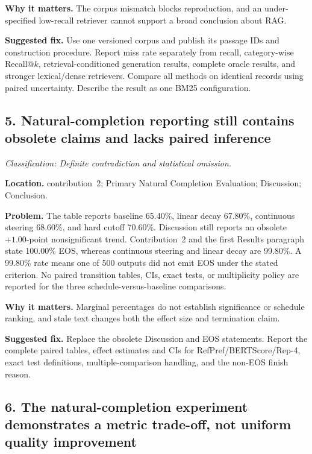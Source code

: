 \documentclass[11pt]{article}
\newcommand{\findinglabel}[1]{\textbf{#1}}
\newcommand{\classification}[1]{\textit{Classification: #1.}}
\begin{document}
\findinglabel{Why it matters.} The corpus mismatch blocks reproduction, and an under-specified low-recall retriever cannot support a broad conclusion about RAG.

\findinglabel{Suggested fix.} Use one versioned corpus and publish its passage IDs and construction procedure.  Report miss rate separately from recall, category-wise Recall@$k$, retrieval-conditioned generation results, complete oracle results, and stronger lexical/dense retrievers.  Compare all methods on identical records using paired uncertainty.  Describe the result as one BM25 configuration.

\subsection*{5. Natural-completion reporting still contains obsolete claims and lacks paired inference}

\classification{Definite contradiction and statistical omission}

\findinglabel{Location.} contribution~2; Primary Natural Completion Evaluation; Discussion; Conclusion.

\findinglabel{Problem.} The table reports baseline 65.40\%, linear decay 67.80\%, continuous steering 68.60\%, and hard cutoff 70.60\%.  Discussion still reports an obsolete $+1.00$-point nonsignificant trend.  Contribution~2 and the first Results paragraph state 100.00\% EOS, whereas continuous steering and linear decay are 99.80\%.  A 99.80\% rate means one of 500 outputs did not emit EOS under the stated criterion.  No paired transition tables, CIs, exact tests, or multiplicity policy are reported for the three schedule-versus-baseline comparisons.

\findinglabel{Why it matters.} Marginal percentages do not establish significance or schedule ranking, and stale text changes both the effect size and termination claim.

\findinglabel{Suggested fix.} Replace the obsolete Discussion and EOS statements.  Report the complete paired tables, effect estimates and CIs for RefPref/BERTScore/Rep-4, exact test definitions, multiple-comparison handling, and the non-EOS finish reason.

\subsection*{6. The natural-completion experiment demonstrates a metric trade-off, not uniform quality improvement}
\end{document}
